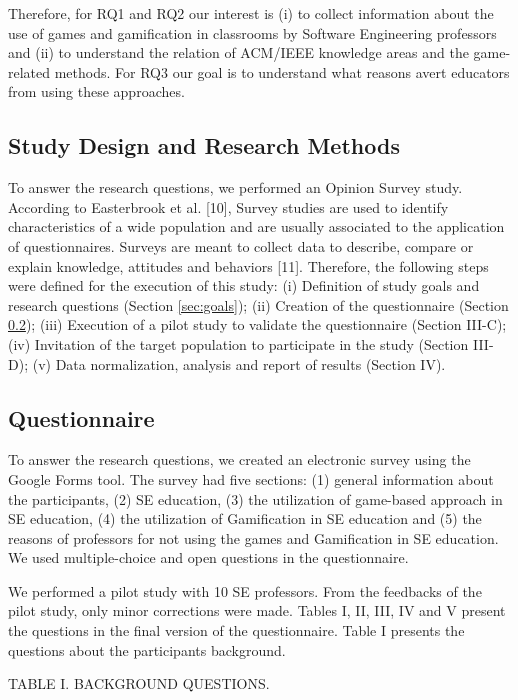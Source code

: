 Therefore, for RQ1 and RQ2 our interest is (i) to collect information about the use of games and gamification in classrooms by Software Engineering professors and (ii) to understand the relation of ACM/IEEE knowledge areas and the game-related methods. For RQ3 our goal is to understand what reasons avert educators from using these approaches.

\subsection{Study Design and Research Methods}
\label{sec:studydesign}

To answer the research questions, we performed an Opinion Survey study. According to Easterbrook et al. [10], Survey studies are used to identify characteristics of a wide population and are usually associated to the application of questionnaires. Surveys are meant to collect data to describe, compare or explain knowledge, attitudes and behaviors [11].
Therefore, the following steps were defined for the execution of this study: (i) Definition of study goals and research questions (Section \ref{sec:goals}); (ii) Creation of the questionnaire (Section \ref{sec:questionnaire}); (iii) Execution of a pilot study to validate the questionnaire (Section III-C); (iv) Invitation of the target population to participate in the study (Section III-D); (v) Data normalization, analysis and report of results (Section IV).

\subsection{Questionnaire}
\label{sec:questionnaire}

To answer the research questions, we created an electronic survey using the Google Forms tool. The survey had five sections: (1) general information about the participants, (2) SE education, (3) the utilization of game-based approach in SE education, (4) the utilization of Gamification in SE education and (5) the reasons of professors for not using the games and Gamification in SE education. We used multiple-choice and open questions in the questionnaire.

We performed a pilot study with 10 SE professors. From the feedbacks of the pilot study, only minor corrections were made. Tables I, II, III, IV and V present the questions in the final version of the questionnaire. Table I presents the questions about the participants background.

TABLE I. BACKGROUND QUESTIONS.


